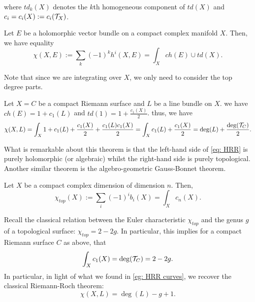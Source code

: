 where $td_k(X)$ denotes the $k$th homogeneous component of $td(X)$ and $c_i=c_i(X):=c_i(\mathcal{T}_X)$.
\begin{theorem}
	Let $E$ be a holomorphic vector bundle on a compact complex manifold $X$. Then, we have equality
	\begin{equation}
		\chi(X,E):=\sum_k(-1)^k h^i(X,E)=\int_X ch(E)\cup td(X).\label{eq: HRR}
	\end{equation}
\end{theorem}
Note that since we are integrating over $X$, we only need to consider the top degree parts.
\begin{example}\label{eg: HRR curves}
	Let $X=C$ be a compact Riemann surface and $L$ be a line bundle on $X$. we have $ch(E)=1+c_1(L)$ and $td(1)=1+\frac{c_1(X)}{2}$. thus, we have
	\[
	\chi(X,L)=\int_X 1+c_1(L)+\frac{c_1(X)}{2}+\frac{c_1(L)c_1(X)}{2}=\int_X c_1(L)+\frac{c_1(X)}{2}=\deg(L)+\frac{\deg(\mathcal{T}_C)}{2}.
	\]
\end{example}
What is remarkable about this theorem is that the left-hand side of \eqref{eq: HRR} is purely holomorphic (or algebraic) whilst the right-hand side is purely topological. Another similar theorem is the algebro-geometric Gauss-Bonnet theorem.
\begin{theorem}
	Let $X$ be a compact complex dimension of dimension $n$. Then, 
	\[
	\chi_{top}(X):=\sum_i(-1)^i b_i(X)=\int_Xc_n(X).
	\]
\end{theorem}

Recall the classical relation between the Euler characteristic $\chi_{top}$ and the genus $g$ of a topological surface: $\chi_{top}=2-2g$. In particular, this implies for a compact Riemann surface $C$ as above, that
\[
\int_Xc_1(X)=\deg(\mathcal{T}_C)=2-2g.
\]
In particular, in light of what we found in \autoref{eg: HRR curves}, we recover the classical Riemann-Roch theorem:
\[
\chi(X,L)=\deg(L)-g+1.
\]
